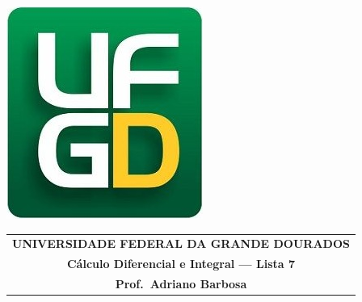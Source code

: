 \documentclass[a4paper,5pt]{amsbook}
\begin{document}
\thispagestyle{empty}
\pagestyle{empty}
\begin{minipage}[h]{0.14\textwidth}
	\includegraphics[scale=0.24]{../../ufgd.png}
\end{minipage}
\begin{minipage}[h]{\textwidth}
\begin{tabular}{c}
{{\bf UNIVERSIDADE FEDERAL DA GRANDE DOURADOS}}\\
{{\bf C\'alculo Diferencial e Integral --- Lista 7}}\\
{{\bf Prof.\ Adriano Barbosa}}\\
\end{tabular}
\vspace{-0.45cm}
%
\end{minipage}

\end{document}
